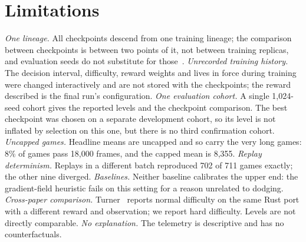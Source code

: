 \documentclass[journal]{IEEEtran}
\begin{document}
\section{Limitations}\label{sec:limits}
\emph{One lineage.} All checkpoints descend from one training lineage; the
comparison between checkpoints is between two points of it, not between
training replicas, and evaluation seeds do not substitute for
those~\cite{henderson,agarwal}. \emph{Unrecorded training history.} The
decision interval, difficulty, reward weights and lives in force during
training were changed interactively and are not stored with the checkpoints;
the reward described is the final run's configuration. \emph{One evaluation
cohort.} A single 1,024-seed cohort gives the reported levels and the
checkpoint comparison. The best checkpoint was chosen on a separate
development cohort, so its level is not inflated by selection on this one, but
there is no third confirmation cohort. \emph{Uncapped games.} Headline means
are uncapped and so carry the very long games: 8\% of games pass 18,000
frames, and the capped mean is 8,355. \emph{Replay
determinism.} Replays in a different batch reproduced 702 of 711 games exactly;
the other nine diverged.
\emph{Baselines.} Neither baseline calibrates the upper end: the gradient-field
heuristic fails on this setting for a reason unrelated to dodging. \emph{Cross-paper
comparison.} Turner~\cite{turner} reports normal difficulty on the same Rust
port with a different reward and observation; we report hard difficulty.
Levels are not directly comparable. \emph{No explanation.} The telemetry
is descriptive and has no counterfactuals.
\end{document}
